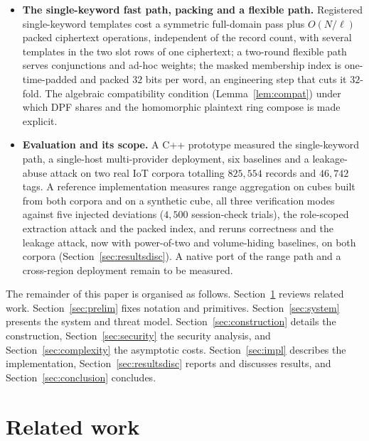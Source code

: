 \documentclass[a4paper,fleqn]{cas-sc}
\begin{document}
\begin{itemize}
\item \textbf{The single-keyword fast path, packing and a flexible path.}
Registered single-keyword templates cost a symmetric full-domain pass plus
$O(N/\ell)$ packed ciphertext operations, independent of the record count, with
several templates in the two slot rows of one ciphertext; a two-round flexible
path serves conjunctions and ad-hoc weights; the masked membership index is
one-time-padded and packed $32$ bits per word, an engineering step that cuts it
$32$-fold. The algebraic compatibility condition (Lemma~\ref{lem:compat}) under
which DPF shares and the homomorphic plaintext ring compose is made explicit.

\item \textbf{Evaluation and its scope.} A C++ prototype measured the
single-keyword path, a single-host multi-provider deployment, six baselines and
a leakage-abuse attack on two real IoT corpora totalling $825{,}554$ records
and $46{,}742$ tags. A reference implementation measures range aggregation on
cubes built from both corpora and on a synthetic cube, all three verification
modes against five injected deviations ($4{,}500$ session-check trials), the
role-scoped extraction attack and the packed index, and reruns correctness and
the leakage attack, now with power-of-two and volume-hiding baselines, on both
corpora (Section~\ref{sec:resultsdisc}). A native port of the range path and a
cross-region deployment remain to be measured.
\end{itemize}

The remainder of this paper is organised as follows.
Section~\ref{sec:related} reviews related work. Section~\ref{sec:prelim} fixes
notation and primitives. Section~\ref{sec:system} presents the system and
threat model. Section~\ref{sec:construction} details
the construction, Section~\ref{sec:security} the security analysis, and
Section~\ref{sec:complexity} the asymptotic costs. Section~\ref{sec:impl}
describes the implementation, Section~\ref{sec:resultsdisc} reports and
discusses results, and Section~\ref{sec:conclusion} concludes.

\section{Related work}
\label{sec:related}
\end{document}
